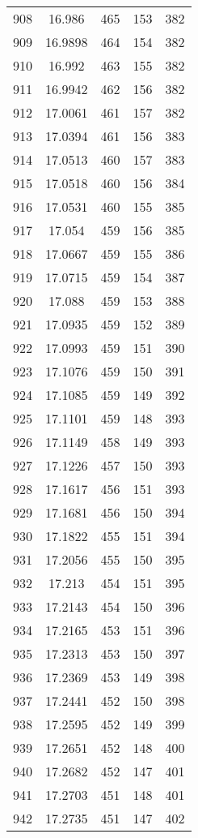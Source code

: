 \documentclass[12pt,a4paper]{article}
\begin{document}
\begin{tabular}{r|cccc}
	908 & 16.986 & 465 & 153 & 382 \\
	909 & 16.9898 & 464 & 154 & 382 \\
	910 & 16.992 & 463 & 155 & 382 \\
	911 & 16.9942 & 462 & 156 & 382 \\
	912 & 17.0061 & 461 & 157 & 382 \\
	913 & 17.0394 & 461 & 156 & 383 \\
	914 & 17.0513 & 460 & 157 & 383 \\
	915 & 17.0518 & 460 & 156 & 384 \\
	916 & 17.0531 & 460 & 155 & 385 \\
	917 & 17.054 & 459 & 156 & 385 \\
	918 & 17.0667 & 459 & 155 & 386 \\
	919 & 17.0715 & 459 & 154 & 387 \\
	920 & 17.088 & 459 & 153 & 388 \\
	921 & 17.0935 & 459 & 152 & 389 \\
	922 & 17.0993 & 459 & 151 & 390 \\
	923 & 17.1076 & 459 & 150 & 391 \\
	924 & 17.1085 & 459 & 149 & 392 \\
	925 & 17.1101 & 459 & 148 & 393 \\
	926 & 17.1149 & 458 & 149 & 393 \\
	927 & 17.1226 & 457 & 150 & 393 \\
	928 & 17.1617 & 456 & 151 & 393 \\
	929 & 17.1681 & 456 & 150 & 394 \\
	930 & 17.1822 & 455 & 151 & 394 \\
	931 & 17.2056 & 455 & 150 & 395 \\
	932 & 17.213 & 454 & 151 & 395 \\
	933 & 17.2143 & 454 & 150 & 396 \\
	934 & 17.2165 & 453 & 151 & 396 \\
	935 & 17.2313 & 453 & 150 & 397 \\
	936 & 17.2369 & 453 & 149 & 398 \\
	937 & 17.2441 & 452 & 150 & 398 \\
	938 & 17.2595 & 452 & 149 & 399 \\
	939 & 17.2651 & 452 & 148 & 400 \\
	940 & 17.2682 & 452 & 147 & 401 \\
	941 & 17.2703 & 451 & 148 & 401 \\
	942 & 17.2735 & 451 & 147 & 402 \\

\end{tabular}
\end{document}
